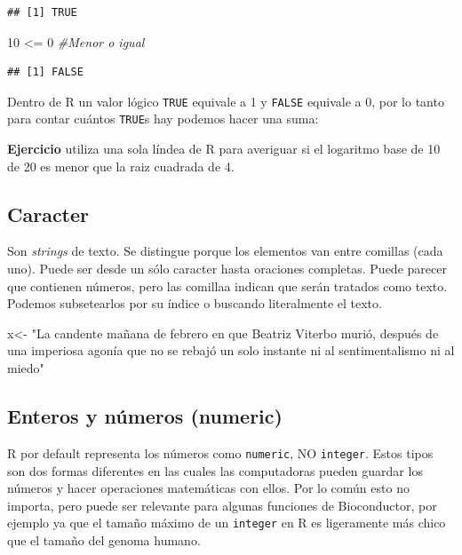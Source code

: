 \documentclass[
]{book}
\newenvironment{Shaded}{\begin{snugshade}}{\end{snugshade}}
\newcommand{\CommentTok}[1]{\textcolor[rgb]{0.56,0.35,0.01}{\textit{#1}}}
\newcommand{\DecValTok}[1]{\textcolor[rgb]{0.00,0.00,0.81}{#1}}
\newcommand{\NormalTok}[1]{#1}
\newcommand{\OtherTok}[1]{\textcolor[rgb]{0.56,0.35,0.01}{#1}}
\newcommand{\SpecialCharTok}[1]{\textcolor[rgb]{0.00,0.00,0.00}{#1}}
\newcommand{\StringTok}[1]{\textcolor[rgb]{0.31,0.60,0.02}{#1}}
\begin{document}
\begin{verbatim}
## [1] TRUE
\end{verbatim}

\begin{Shaded}
\begin{Highlighting}[]
\DecValTok{10} \SpecialCharTok{\textless{}=} \DecValTok{0}    \CommentTok{\#Menor o igual }
\end{Highlighting}
\end{Shaded}

\begin{verbatim}
## [1] FALSE
\end{verbatim}

Dentro de R un valor lógico \texttt{TRUE} equivale a 1 y \texttt{FALSE} equivale a 0, por lo tanto para contar cuántos \texttt{TRUE}s hay podemos hacer una suma:

\textbf{Ejercicio} utiliza una sola líndea de R para averiguar si el logaritmo base de 10 de 20 es menor que la raiz cuadrada de 4.

\hypertarget{caracter}{%
\subsection{Caracter}\label{caracter}}

Son \emph{strings} de texto. Se distingue porque los elementos van entre comillas (cada uno). Puede ser desde un sólo caracter hasta oraciones completas. Puede parecer que contienen números, pero las comillaa indican que serán tratados como texto. Podemos subsetearlos por su índice o buscando literalmente el texto.

\begin{Shaded}
\begin{Highlighting}[]
\NormalTok{x}\OtherTok{\textless{}{-}} \StringTok{"La candente mañana de febrero en que Beatriz Viterbo murió, después de una imperiosa agonía que no se rebajó un solo instante ni al sentimentalismo ni al miedo"}
\end{Highlighting}
\end{Shaded}

\hypertarget{enteros-y-nuxfameros-numeric}{%
\subsection{Enteros y números (numeric)}\label{enteros-y-nuxfameros-numeric}}

R por default representa los números como \texttt{numeric}, NO \texttt{integer}. Estos tipos son dos formas diferentes en las cuales las computadoras pueden guardar los números y hacer operaciones matemáticas con ellos. Por lo común esto no importa, pero puede ser relevante para algunas funciones de Bioconductor, por ejemplo ya que el tamaño máximo de un \texttt{integer} en R es ligeramente más chico que el tamaño del genoma humano.
\end{document}
